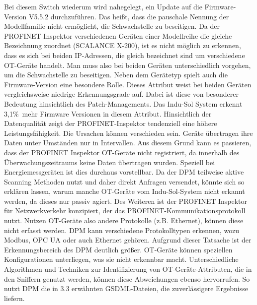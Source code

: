 \noindent Bei diesem Switch wiederum wird nahegelegt, ein Update auf die Firmware-Version V5.5.2 durchzuführen. Das heißt, dass die pauschale Nennung der Modellfamilie nicht ermöglicht, die Schwachstelle zu beseitigen. Da der PROFINET Inspektor verschiedenen Geräten einer Modellreihe die gleiche Bezeichnung zuordnet (SCALANCE X-200), ist es nicht möglich zu erkennen, dass es sich bei beiden IP-Adressen, die gleich bezeichnet sind um verschiedene OT-Geräte handelt. Man muss also bei beiden Geräten unterschiedlich vorgehen, um die Schwachstelle zu beseitigen. Neben dem Gerätetyp spielt auch die Firmware-Version eine besondere Rolle. Dieses Attribut weist bei beiden Geräten vergleichsweise niedrige Erkennungsgrade auf. Dabei ist diese von besonderer Bedeutung hinsichtlich des Patch-Managements. Das Indu-Sol System erkennt 3,1\%\ mehr Firmware Versionen in diesem Attribut. Hinsichtlich der Datenqualität zeigt der PROFINET-Inspektor tendenziell eine höhere Leistungsfähigkeit. Die Ursachen können verschieden sein. Geräte übertragen ihre Daten unter Umständen nur in Intervallen. Aus diesem Grund kann es passieren, dass der PROFINET Inspektor OT-Geräte nicht registriert, da innerhalb des Überwachungszeitraums keine Daten übertragen wurden. Speziell bei Energiemessgeräten ist dies durchaus vorstellbar. Da der DPM teilweise aktive Scanning Methoden nutzt und daher direkt Anfragen versendet, könnte sich so erklären lassen, warum manche OT-Geräte vom Indu-Sol-System nicht erkannt werden, da dieses nur passiv agiert. Des Weiteren ist der PROFINET Inspektor für Netzwerkverkehr konzipiert, der das PROFINET-Kommunikationsprotokoll nutzt. Nutzen OT-Geräte also andere Protokolle (z.B. Ethernet), können diese nicht erfasst werden. DPM kann verschiedene Protokolltypen erkennen, wozu Modbus, OPC UA oder auch Ethernet gehören. Aufgrund dieser Tatsache ist der Erkennungsbereich des DPM deutlich größer. OT-Geräte können speziellen Konfigurationen unterliegen, was sie nicht erkennbar macht. Unterschiedliche Algorithmen und Techniken zur Identifizierung von OT-Geräte-Attributen, die in den Sniffern genutzt werden, können diese Abweichungen ebenso hervorrufen. So nutzt DPM die in 3.3 erwähnten GSDML-Dateien, die zuverlässigere Ergebnisse liefern.

